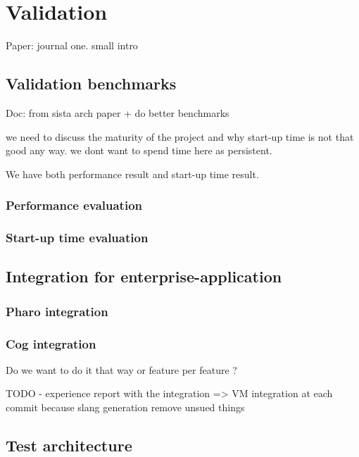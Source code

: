 \documentclass[a4paper,12pt,twoside]{../includes/ThesisStyle}
\begin{document}
\fi

\chapter{Validation}
\label{chap:validation}
\minitoc

Paper: journal one. 
small intro

\section{Validation benchmarks}

Doc: from sista arch paper + do better benchmarks

we need to discuss the maturity of the project and why start-up time is not that good any way. we dont want to spend time here as persistent.

We have both performance result and start-up time result.

\subsection{Performance evaluation}

\subsection{Start-up time evaluation}

\section{Integration for enterprise-application}

\subsection{Pharo integration}

\subsection{Cog integration}

Do we want to do it that way or feature per feature ?

TODO - experience report with the integration
=> VM integration at each commit because slang generation remove unsued things

\section{Test architecture}
\end{document}
